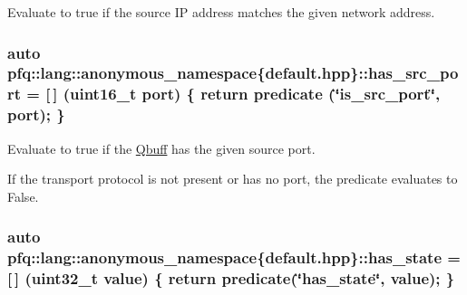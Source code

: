 Evaluate to {\ttfamily true} if the source IP address matches the given network address. 

\subsubsection[{\texorpdfstring{has\+\_\+src\+\_\+port}{has_src_port}}]{\setlength{\rightskip}{0pt plus 5cm}auto pfq\+::lang\+::anonymous\+\_\+namespace\{default.\+hpp\}\+::has\+\_\+src\+\_\+port = \mbox{[}$\,$\mbox{]} (uint16\+\_\+t {\bf port}) \{ return {\bf predicate} (\char`\"{}is\+\_\+src\+\_\+port\char`\"{}, port); \}}\hypertarget{namespacepfq_1_1lang_1_1anonymous__namespace_02default_8hpp_03_a964d5ed41f50a1f3a04176f8e54d7a5a}{}\label{namespacepfq_1_1lang_1_1anonymous__namespace_02default_8hpp_03_a964d5ed41f50a1f3a04176f8e54d7a5a}


Evaluate to {\ttfamily true} if the \hyperlink{structpfq_1_1lang_1_1Qbuff}{Qbuff} has the given source port. 

If the transport protocol is not present or has no port, the predicate evaluates to False. 
\subsubsection[{\texorpdfstring{has\+\_\+state}{has_state}}]{\setlength{\rightskip}{0pt plus 5cm}auto pfq\+::lang\+::anonymous\+\_\+namespace\{default.\+hpp\}\+::has\+\_\+state = \mbox{[}$\,$\mbox{]} (uint32\+\_\+t value) \{ return {\bf predicate}(\char`\"{}has\+\_\+state\char`\"{}, value); \}}\hypertarget{namespacepfq_1_1lang_1_1anonymous__namespace_02default_8hpp_03_a8efacc41a17e01f17a25e8fc1d784c74}{}\label{namespacepfq_1_1lang_1_1anonymous__namespace_02default_8hpp_03_a8efacc41a17e01f17a25e8fc1d784c74}



